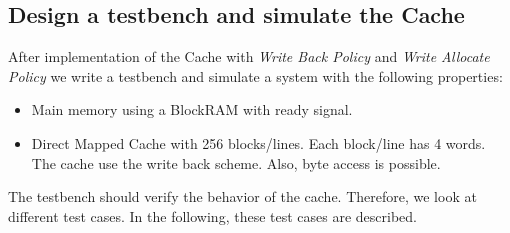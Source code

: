 \subsection{Design a testbench and simulate the Cache}
After implementation of the Cache with \textit{Write Back Policy} and \textit{Write Allocate Policy} we write a testbench and simulate a system with the following properties:
\begin{itemize} 
	\item Main memory using a BlockRAM with ready signal.
	\item Direct Mapped Cache with 256 blocks/lines. Each block/line has 4 words. The cache use the write back scheme. Also, byte access is possible.	
\end{itemize}
The testbench should verify the behavior of the cache. Therefore, we look at different test cases. In the following, these test cases are described.
